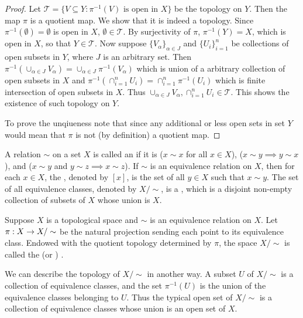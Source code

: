 \documentclass[11pt,a4paper]{article}
\begin{document}
\begin{proof}
Let $\mathcal{T} = \{V\subseteq Y: \pi^{-1}(V) \text{ is open in } X\}$ be the topology on $Y$. Then the map $\pi$ is a quotient map. We show that it is indeed a topology. Since $\pi^{-1}(\emptyset) = \emptyset$ is open in $X$, $\emptyset\in \mathcal{T}$. By surjectivity of $\pi$, $\pi^{-1}(Y) = X$, which is open in $X$, so that $Y\in \mathcal{T}$. Now suppose $\{V_\alpha\}_{\alpha\in J}$ and $\{U_i\}_{i=1}^n$ be collections of open subsets in $Y$, where $J$ is an arbitrary set. Then $\pi^{-1}(\cup_{\alpha\in J} V_\alpha) = \cup_{\alpha\in J}\pi^{-1}(V_\alpha)$ which is union of a arbitrary collection of open subsets in $X$ and $\pi^{-1}(\cap_{i=1}^n U_i) = \cap_{i=1}^n\pi^{-1}(U_i)$ which is finite intersection of open subsets in $X$. Thus $\cup_{\alpha\in J} V_\alpha,\cap_{i=1}^n U_i\in \mathcal{T}$. This shows the existence of such topology on $Y$.

To prove the unqiueness note that since any additional
or less open sets in set $Y$ would mean that $\pi$ is not (by definition) a quotient map.
\end{proof}

A relation $\sim$ on a set $X$ is called an  if it is ($x\sim x$ for all $x\in X$), ($x\sim y\implies y\sim x$), and ($x\sim y$ and $y\sim z\implies x\sim z$). If $\sim$ is an equivalence relation on $X$, then for each $x\in X$, the , denoted by $[x]$, is the set of all $y\in X$ such that $x\sim y$. The set of all equivalence classes, denoted by $X/\sim$, is a , which is a disjoint non-empty collection of subsets of $X$ whose union is $X$.

\begin{mydef}
Suppose $X$ is a topological space and $\sim$ is an equivalence relation on $X$. Let $\pi:X\rightarrow X/\sim$ be the natural projection sending each point to its equivalence class. Endowed with the quotient topology determined by $\pi$, the space $X/\sim$ is called the  (or ) .
\end{mydef}

\begin{remark}
We can describe the topology of $X/\sim$ in another way. A subset $U$ of $X/\sim$ is a collection of equivalence classes, and the set $\pi^{-1}(U)$ is the union of the equivalence classes belonging to $U$. Thus the typical open set of $X/\sim$ is a collection of equivalence classes whose union is an open set of $X$.
\end{remark}
\end{document}
